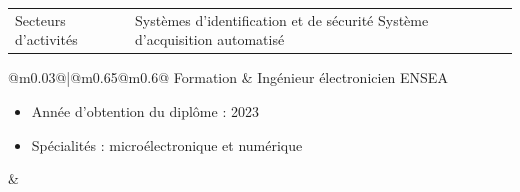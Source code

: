 \documentclass{article}
\begin{document}
\begin{center}
\end{center}


\begin{tabular}{@{}m{}@{\hspace{0.07\textwidth}}!{\color{deepPurple}\vline width 2pt}@{\hspace{0.025\textwidth}}m{0.75\textwidth}@{}}
    \textcolor{gray!80}{Secteurs d'activités} & 
    \textcolor{gray!80}{Systèmes d’identification et de sécurité} \newline 
    \textcolor{gray!80}{Système d'acquisition automatisé} \newline 
\end{tabular}



\begin{center}
\end{center}


\begin{tabular}{@{}m{0.03\textwidth}@{\hspace{0.07\textwidth}}!{\color{deepPurple}\vline width 2pt}@{\hspace{0.025\textwidth}}m{0.65\textwidth}@{}m{0.6\linewidth}@{}}
    \textcolor{gray!80}{Formation} & 
    \textcolor{gray!150}{Ingénieur électronicien ENSEA}
    \begin{itemize}[label={\textcolor{gray!80}{--}}, leftmargin=2em, topsep=0pt, partopsep=0pt, itemsep=0pt, parsep=0pt] %
        \item \textcolor{gray!80}{Année d'obtention du diplôme : 2023}
        \item \textcolor{gray!80}{Spécialités : microélectronique et numérique} 
    \end{itemize} &
\end{tabular}


\end{document}
